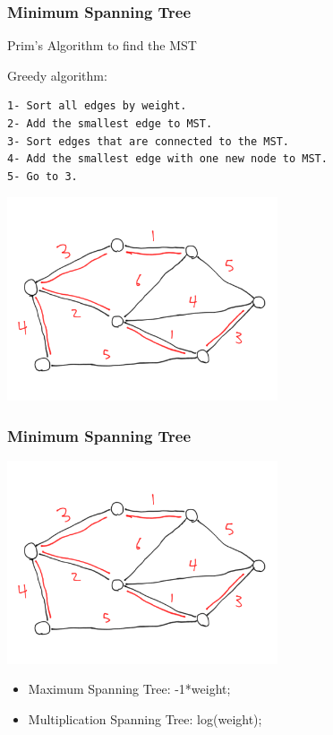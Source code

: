 \documentclass{beamer}
\begin{document}
\begin{frame}
  \frametitle{Minimum Spanning Tree}
  \begin{block}{Prim's Algorithm to find the MST}
    {\smaller
    Greedy algorithm:
\begin{verbatim}
1- Sort all edges by weight. 
2- Add the smallest edge to MST.
3- Sort edges that are connected to the MST.
4- Add the smallest edge with one new node to MST.
5- Go to 3.
\end{verbatim}}
  \end{block}
  \begin{center}
    \includegraphics[width=0.6\textwidth]{img/minspantree}
  \end{center}
\end{frame}

\begin{frame}
  \frametitle{Minimum Spanning Tree}
  \begin{center}
    \includegraphics[width=0.6\textwidth]{img/minspantree}
  \end{center}
  \begin{itemize}
  \item Maximum Spanning Tree: -1*weight;
  \item Multiplication Spanning Tree: log(weight);
  \end{itemize}
\end{frame}
\end{document}
